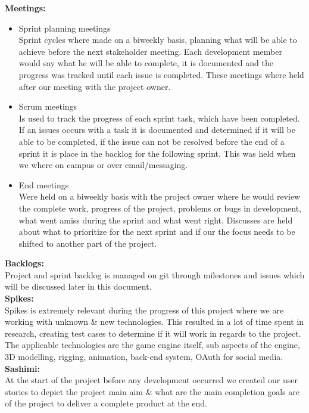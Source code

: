 \documentclass[letterpaper]{article}
\begin{document}
		\noindent\textbf{Meetings:}
		\begin{itemize}
			\item Sprint planning meetings \\
					Sprint cycles where made on a biweekly basis, planning what will be able to achieve before the next stakeholder meeting. Each development member would say what he will be able to complete, it is documented and the progress was tracked until each issue is completed. These meetings where held after our meeting with the project owner.
			\item Scrum meetings \\
					Is used to track the progress of each sprint task, which have been completed. If an issues occurs with a task it is documented and determined if it will be able to be completed, if the issue can not be resolved before the end of a sprint it is place in the backlog for the following sprint. This was held when we where on campus or over email/messaging.
			\item End meetings \\
					Were held on a biweekly basis with the project owner where he would review the complete work, progress of the project, problems or bugs in development, what went amiss during the sprint and what went right. Discusses are held about what to prioritize for the next sprint and if our the focus needs to be shifted to another part of the project.  \\
		\end{itemize}
		 
		\noindent\textbf{Backlogs:} \\
			Project and sprint backlog is managed on git through milestones and issues which will be discussed later in this document. \\
			
		\noindent\textbf{Spikes:} \\
			Spikes is extremely relevant during the progress of this project where we are working with unknown \& new technologies. This resulted in a lot of time spent in research, creating test cases to determine if it will work in regards to the project. The applicable technologies are the game engine itself, sub aspects of the engine, 3D modelling, rigging, animation, back-end system, OAuth for social media. \\
			
		\noindent\textbf{Sashimi:} \\
			At the start of the project before any development occurred we created our user stories to depict the project main aim \& what are the main completion goals are of the project to deliver a complete product at the end.
			
\end{document}
